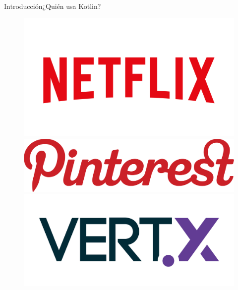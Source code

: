 \begin{frame}{Introducción}{¿Quién usa Kotlin?}
  \begin{figure}[!htb]
    \includegraphics[width=\linewidth]{images/introduction/netflix_logo}
  \endminipage\hfill
    \includegraphics[width=\linewidth]{images/introduction/pinterest_logo}
  \endminipage\hfill
    \includegraphics[width=\linewidth]{images/introduction/vertx_logo}
  \endminipage
  \end{figure}


\end{frame}
